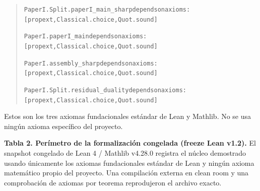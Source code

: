 \documentclass[spanish,11pt,a4paper]{article}
\begin{document}
\begin{quote}
{\LeanSymbols\fontsize{8}{10}\selectfont
\noindent \nolinkurl{PaperI.Split.paperI_main_sharp}\hspace{0.45em}\nolinkurl{depends}\hspace{0.45em}\nolinkurl{on}\hspace{0.45em}\nolinkurl{axioms:}\hspace{0.45em}\nolinkurl{[propext,}\hspace{0.45em}\nolinkurl{Classical.choice,}\hspace{0.45em}\nolinkurl{Quot.sound]}\par
\noindent \nolinkurl{PaperI.paperI_main}\hspace{4.05em}\nolinkurl{depends}\hspace{0.45em}\nolinkurl{on}\hspace{0.45em}\nolinkurl{axioms:}\hspace{0.45em}\nolinkurl{[propext,}\hspace{0.45em}\nolinkurl{Classical.choice,}\hspace{0.45em}\nolinkurl{Quot.sound]}\par
\noindent \nolinkurl{PaperI.assembly_sharp}\hspace{2.7em}\nolinkurl{depends}\hspace{0.45em}\nolinkurl{on}\hspace{0.45em}\nolinkurl{axioms:}\hspace{0.45em}\nolinkurl{[propext,}\hspace{0.45em}\nolinkurl{Classical.choice,}\hspace{0.45em}\nolinkurl{Quot.sound]}\par
\noindent \nolinkurl{PaperI.Split.residual_duality}\hspace{0.45em}\nolinkurl{depends}\hspace{0.45em}\nolinkurl{on}\hspace{0.45em}\nolinkurl{axioms:}\hspace{0.45em}\nolinkurl{[propext,}\hspace{0.45em}\nolinkurl{Classical.choice,}\hspace{0.45em}\nolinkurl{Quot.sound]}\par
}
\end{quote}

Estos son los tres axiomas fundacionales estándar de Lean y Mathlib. No
se usa ningún axioma específico del proyecto.

\textbf{Tabla 2. Perímetro de la formalización congelada (freeze Lean
v1.2).} El snapshot congelado de Lean 4 / Mathlib v4.28.0 registra el
núcleo demostrado usando únicamente los axiomas fundacionales estándar
de Lean y ningún axioma matemático propio del proyecto. Una compilación
externa en clean room y una comprobación de axiomas por teorema
reprodujeron el archivo exacto.
\end{document}
